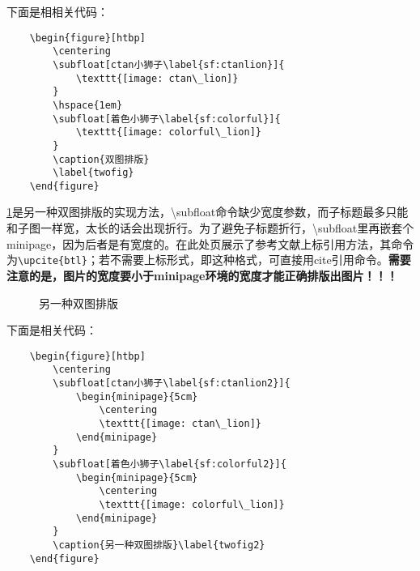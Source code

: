 下面是相相关代码：
\begin{verbatim}
	\begin{figure}[htbp]
		\centering
		\subfloat[ctan小狮子\label{sf:ctanlion}]{
			\texttt{[image: ctan\_lion]}
		}
		\hspace{1em}
		\subfloat[着色小狮子\label{sf:colorful}]{
			\texttt{[image: colorful\_lion]}
		}
		\caption{双图排版}
		\label{twofig}
	\end{figure}
\end{verbatim}

\cref{twofig2}是另一种双图排版的实现方法，\textbackslash subfloat命令缺少宽度参数，而子标题最多只能和子图一样宽，太长的话会出现折行。为了避免子标题折行，\textbackslash subfloat里再嵌套个minipage，因为后者是有宽度的。在此处页展示了参考文献上标引用方法，其命令为\verb|\upcite{btl}|；若不需要上标形式，即\cite{btl}这种格式，可直接用cite引用命令。\textbf{需要注意的是，图片的宽度要小于minipage环境的宽度才能正确排版出图片！！！}

\begin{figure}[htbp]
	\centering
	\caption{另一种双图排版}\label{twofig2}
\end{figure}


下面是相关代码：
\begin{verbatim}
	\begin{figure}[htbp]
		\centering
		\subfloat[ctan小狮子\label{sf:ctanlion2}]{
			\begin{minipage}{5cm}
				\centering
				\texttt{[image: ctan\_lion]}
			\end{minipage}
		}
		\subfloat[着色小狮子\label{sf:colorful2}]{
			\begin{minipage}{5cm}
				\centering
				\texttt{[image: colorful\_lion]}
			\end{minipage}
		}
		\caption{另一种双图排版}\label{twofig2}
	\end{figure}
\end{verbatim}

